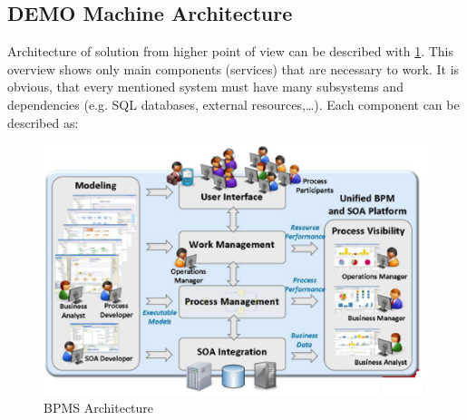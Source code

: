 \subsection{DEMO Machine Architecture}
Architecture of solution from  higher point of view can be described with \cref{fig:demo-machine-top}. This overview shows only main components (services) that are necessary to work. It is obvious, that every mentioned system must have many subsystems and dependencies (e.g. SQL databases, external resources,\dots). Each component can be described as:
\begin{figure}[ht!]
	\centering
    \includegraphics[width=12cm]{img/tibco-bpm-architecture.png}
    \caption{BPMS Architecture\cite{tibco-bpm-2016}}
    \label{fig:demo-machine-top}
\end{figure}
